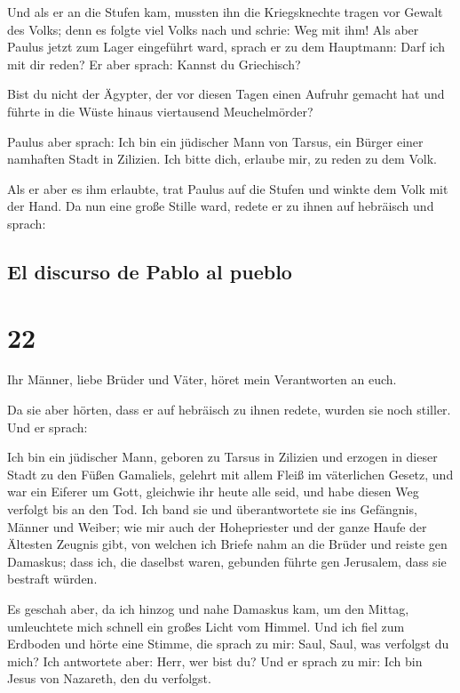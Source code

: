  Und als er an die Stufen kam, mussten ihn die
Kriegsknechte tragen vor Gewalt des Volks;  denn es
folgte viel Volks nach und schrie: Weg mit ihm!  Als aber
Paulus jetzt zum Lager eingeführt ward, sprach er zu dem Hauptmann: Darf
ich mit dir reden? Er aber sprach: Kannst du Griechisch?

 Bist du nicht der Ägypter, der vor diesen Tagen einen
Aufruhr gemacht hat und führte in die Wüste hinaus viertausend
Meuchelmörder?

 Paulus aber sprach: Ich bin ein jüdischer Mann von
Tarsus, ein Bürger einer namhaften Stadt in Zilizien. Ich bitte dich,
erlaube mir, zu reden zu dem Volk.

 Als er aber es ihm erlaubte, trat Paulus auf die Stufen
und winkte dem Volk mit der Hand. Da nun eine große Stille ward, redete
er zu ihnen auf hebräisch und sprach:

\hypertarget{el-discurso-de-pablo-al-pueblo}{%
\subsection{El discurso de Pablo al
pueblo}\label{el-discurso-de-pablo-al-pueblo}}

\hypertarget{section-21}{%
\section{22}\label{section-21}}

 Ihr Männer, liebe Brüder und Väter, höret mein
Verantworten an euch.

 Da sie aber hörten, dass er auf hebräisch zu ihnen
redete, wurden sie noch stiller. Und er sprach:

 Ich bin ein jüdischer Mann, geboren zu Tarsus in Zilizien
und erzogen in dieser Stadt zu den Füßen Gamaliels, gelehrt mit allem
Fleiß im väterlichen Gesetz, und war ein Eiferer um Gott, gleichwie ihr
heute alle seid,  und habe diesen Weg verfolgt bis an den
Tod. Ich band sie und überantwortete sie ins Gefängnis, Männer und
Weiber;  wie mir auch der Hohepriester und der ganze Haufe
der Ältesten Zeugnis gibt, von welchen ich Briefe nahm an die Brüder und
reiste gen Damaskus; dass ich, die daselbst waren, gebunden führte gen
Jerusalem, dass sie bestraft würden.

 Es geschah aber, da ich hinzog und nahe Damaskus kam, um
den Mittag, umleuchtete mich schnell ein großes Licht vom Himmel.
 Und ich fiel zum Erdboden und hörte eine Stimme, die
sprach zu mir: Saul, Saul, was verfolgst du mich?  Ich
antwortete aber: Herr, wer bist du? Und er sprach zu mir: Ich bin Jesus
von Nazareth, den du verfolgst.

